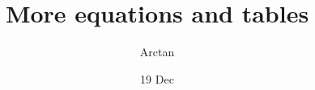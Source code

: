 \documentclass{article}
\title{More equations and tables}
\author{Arctan}
\date{19 Dec}
\begin{document}
\maketitle

\
\end{document}
